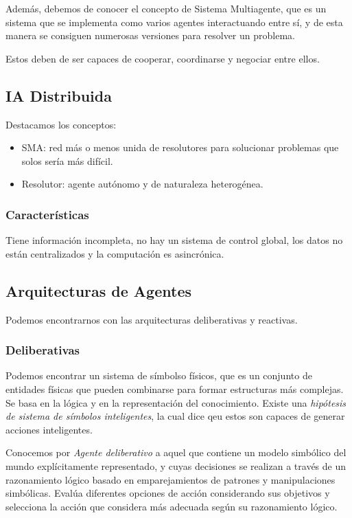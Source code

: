 Además, debemos de conocer el concepto de Sistema Multiagente, que es un sistema que se implementa como varios agentes interactuando entre sí, y de esta manera se consiguen numerosas versiones para resolver un problema.

Estos deben de ser capaces de cooperar, coordinarse y negociar entre ellos.

\subsection{IA Distribuida}

Destacamos los conceptos:
\begin{itemize}
    \item SMA: red más o menos unida de resolutores para solucionar problemas que solos sería más difícil.
    \item Resolutor: agente autónomo y de naturaleza heterogénea.
\end{itemize}

\subsubsection{Características}

Tiene información incompleta, no hay un sistema de control global, los datos no están centralizados y la computación es asincrónica.

\subsection{Arquitecturas de Agentes}

Podemos encontrarnos con las arquitecturas deliberativas y reactivas.

\subsubsection{Deliberativas}

Podemos encontrar un sistema de símbolso físicos, que es un conjunto de entidades físicas que pueden combinarse para formar estructuras más complejas. Se basa en la lógica y en la representación del conocimiento. Existe una \textit{hipótesis de sistema de símbolos inteligentes}, la cual dice qeu estos son capaces de generar acciones inteligentes.

Conocemos por \textit{Agente deliberativo} a  aquel que contiene un modelo simbólico del
mundo explícitamente representado, y cuyas decisiones se realizan a
través de un razonamiento lógico basado en emparejamientos de
patrones y manipulaciones simbólicas. Evalúa diferentes opciones de
acción considerando sus objetivos y selecciona la acción que
considera más adecuada según su razonamiento lógico.

